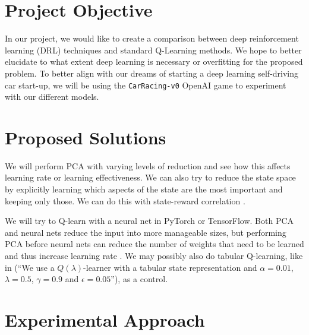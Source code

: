 \documentclass[11pt]{article}
\begin{document}
\section{Project Objective}

In our project, we would like to create a comparison between deep reinforcement learning (DRL) techniques and standard Q-Learning methods. We hope to better elucidate to what extent deep learning is necessary or overfitting for the proposed problem. To better align with our dreams of starting a deep learning self-driving car start-up, we will be using the \texttt{CarRacing-v0} OpenAI game \cite{brockman2016openai} to experiment with our different models.

\section{Proposed Solutions}

We will perform PCA with varying levels of reduction and see how this affects learning rate or learning effectiveness. We can also try to reduce the state space by explicitly learning which aspects of the state are the most important and keeping only those. We can do this with state-reward correlation \cite{kishima2013reduction}.

We will try to Q-learn with a neural net in PyTorch \cite{paszke2017pytorch} or TensorFlow. Both PCA and neural nets reduce the input into more manageable sizes, but performing PCA before neural nets can reduce the number of weights that need to be learned and thus increase learning rate 
. We may possibly also do tabular Q-learning, like in \cite{curran2015using} (``We use a $Q(\lambda)$-learner with a tabular state representation and $\alpha=0.01$, $\lambda=0.5$, $\gamma=0.9$ and $\epsilon=0.05$''), as a control.


\section{Experimental Approach}



\end{document}
